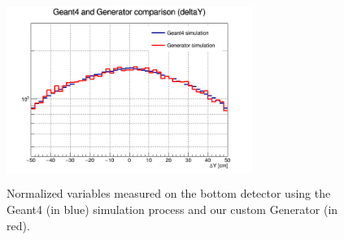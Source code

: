 \documentclass[a4paper, 11pt, twoside, openright]{report}
\begin{document}
\begin{figure}[htbp]
{\begin{minipage}[b]{.49\textwidth}
\end{minipage}\hfill
\begin{minipage}[b]{.49\textwidth}
\includegraphics[width=8cm, height=6cm]{figs/deltaY-17p2vs17p2.png}
\end{minipage} \hfill
}
\caption{Normalized variables measured on the bottom detector using the Geant4 (in blue) simulation process and our custom Generator (in red).}
\label{fig:genComp}
\end{figure}
\end{document}
